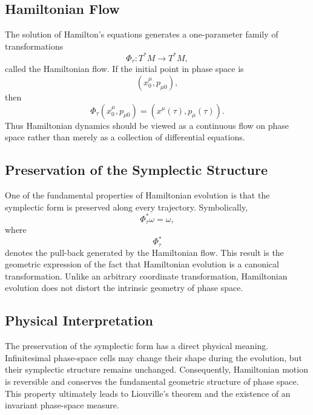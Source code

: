 \subsection{Hamiltonian Flow}
The solution of Hamilton's equations generates a one-parameter family of
transformations
\[\Phi_\tau :T^{*}M\rightarrow T^{*}M,\]
called the Hamiltonian flow.
If the initial point in phase space is
\[(x^\mu_0,p_{\mu0}),\]
then
\[\Phi_\tau(x^\mu_0,p_{\mu0})=(x^\mu(\tau),p_\mu(\tau)).\]
Thus Hamiltonian dynamics should be viewed as a continuous flow on phase
space rather than merely as a collection of differential equations.
\subsection{Preservation of the Symplectic Structure}
One of the fundamental properties of Hamiltonian evolution is that the
symplectic form is preserved along every trajectory.
Symbolically,
\[\boxed{\Phi_\tau^{*}\omega=\omega,}\]
where
\[\Phi_\tau^{*}\]
denotes the pull-back generated by the Hamiltonian flow.
This result is the geometric expression of the fact that Hamiltonian
evolution is a canonical transformation.
Unlike an arbitrary coordinate transformation, Hamiltonian evolution
does not distort the intrinsic geometry of phase space.
\subsection{Physical Interpretation}
The preservation of the symplectic form has a direct physical meaning.
Infinitesimal phase-space cells may change their shape during the
evolution, but their symplectic structure remains unchanged.
Consequently, Hamiltonian motion is reversible and conserves the
fundamental geometric structure of phase space.
This property ultimately leads to Liouville's theorem and the existence
of an invariant phase-space measure.
